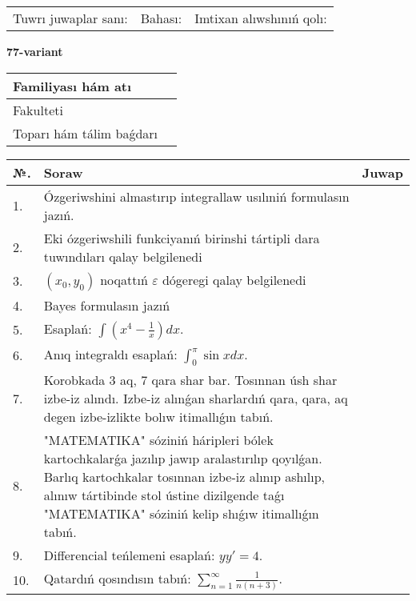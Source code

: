 \documentclass{article}
\begin{document}
\vspace{1cm}

\begin{tabular}{ c c c }
Tuwrı juwaplar sanı: \underline{\hspace{2cm}} & Bahası: \underline{\hspace{2cm}} & Imtixan alıwshınıń qolı: \underline{\hspace{2cm}} \\
\end{tabular}

\newpage

\begin{center}\textbf{77-variant}\end{center}

\bgroup
\def\arraystretch{1.5}
\begin{tabular}{ |m{6cm}|m{10cm}| }
  \hline
  Familiyası hám atı & \\
  \hline
  Fakulteti &\\
  \hline
  Toparı hám tálim baǵdarı & \\
  \hline
\end{tabular}
\egroup

\vspace{0.5cm}

\bgroup
\def\arraystretch{2}
\begin{tabular}{ |l|m{8cm}|m{7cm}| }
  \hline
  №. & Soraw & Juwap \\
  \hline
  1. & Ózgeriwshini almastırıp integrallaw usılıniń formulasın jazıń. &  \\
  \hline
  2. & Eki ózgeriwshili funkciyanıń birinshi tártipli dara tuwındıları qalay belgilenedi &  \\
  \hline
  3. & $(x_{0} , y_{0})$ noqattıń $\varepsilon$ dógeregi qalay belgilenedi &  \\
  \hline
  4. & Bayes formulasın jazıń &  \\
  \hline
  5. & Esaplań: $\displaystyle\int \left( x^{4}-\frac{1}{x} \right)dx$. &  \\
  \hline
  6. & Anıq integraldı esaplań: $\displaystyle\int_{0}^{\pi}\sin xdx$. &  \\
  \hline
  7. & Korobkada 3 aq, 7 qara shar bar. Tosınnan úsh shar izbe-iz alındı. Izbe-iz alınǵan sharlardıń qara, qara, aq degen izbe-izlikte bolıw itimallıǵın tabıń. &  \\
  \hline
  8. & "MATEMATIKA" sóziniń háripleri bólek kartochkalarǵa jazılıp jawıp aralastırılıp qoyılǵan. Barlıq kartochkalar tosınnan izbe-iz alınıp ashılıp, alınıw tártibinde stol ústine dizilgende taǵı "MATEMATIKA" sóziniń kelip shıǵıw itimallıǵın tabıń. &  \\
  \hline
  9. & Differencial teńlemeni esaplań: $yy'= 4$. &  \\
  \hline
  10. & Qatardıń qosındısın tabıń: $\displaystyle\sum_{n = 1}^{\infty}\frac{1}{n(n + 3)}$. &  \\
  \hline
\end{tabular}
\egroup
\end{document}
